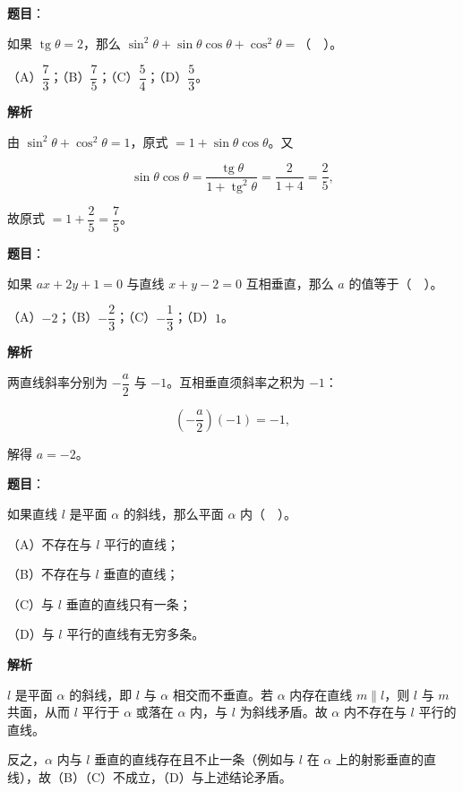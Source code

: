 \begin{answer}

\textbf{题目}：

如果 $\operatorname{tg}\theta=2$，那么 $\sin^2\theta+\sin\theta\cos\theta+\cos^2\theta=$（　）。

（A）$\dfrac73$；（B）$\dfrac75$；（C）$\dfrac54$；（D）$\dfrac53$。

\textbf{解析}

由 $\sin^2\theta+\cos^2\theta=1$，原式 $=1+\sin\theta\cos\theta$。又

\nopagebreak[4]
\[
\sin\theta\cos\theta=\frac{\operatorname{tg}\theta}{1+\operatorname{tg}^2\theta}=\frac{2}{1+4}=\frac25,
\]

故原式 $=1+\dfrac25=\dfrac75$。


\end{answer}
\begin{answer}

\textbf{题目}：

如果 $ax+2y+1=0$ 与直线 $x+y-2=0$ 互相垂直，那么 $a$ 的值等于（　）。

（A）$-2$；（B）$-\dfrac23$；（C）$-\dfrac13$；（D）$1$。

\textbf{解析}

两直线斜率分别为 $-\dfrac{a}{2}$ 与 $-1$。互相垂直须斜率之积为 $-1$：

\nopagebreak[4]
\[
\left(-\frac{a}{2}\right)(-1)=-1,
\]

解得 $a=-2$。


\end{answer}
\begin{answer}

\textbf{题目}：

如果直线 $l$ 是平面 $\alpha$ 的斜线，那么平面 $\alpha$ 内（　）。

（A）不存在与 $l$ 平行的直线；

（B）不存在与 $l$ 垂直的直线；

（C）与 $l$ 垂直的直线只有一条；

（D）与 $l$ 平行的直线有无穷多条。

\textbf{解析}

$l$ 是平面 $\alpha$ 的斜线，即 $l$ 与 $\alpha$ 相交而不垂直。若 $\alpha$ 内存在直线 $m\parallel l$，则 $l$ 与 $m$ 共面，从而 $l$ 平行于 $\alpha$ 或落在 $\alpha$ 内，与 $l$ 为斜线矛盾。故 $\alpha$ 内不存在与 $l$ 平行的直线。

反之，$\alpha$ 内与 $l$ 垂直的直线存在且不止一条（例如与 $l$ 在 $\alpha$ 上的射影垂直的直线），故（B）（C）不成立，（D）与上述结论矛盾。


\end{answer}
